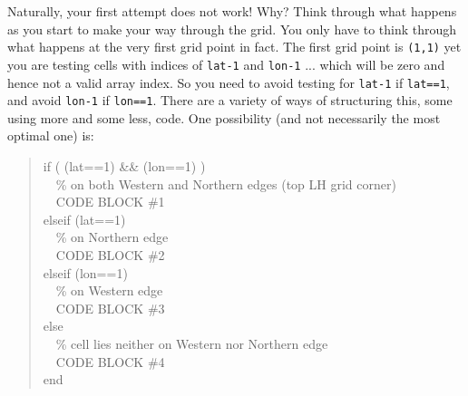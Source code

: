 \documentclass{tufte-book} %
\newenvironment{docspec}{\begin{quotation}\ttfamily\parskip0pt\parindent0pt\ignorespaces}{\end{quotation}}
\begin{document}
Naturally, your first attempt does not work! Why? Think through what happens as you start to make your way through the grid. You only have to think through what happens at the very first grid point in fact. The first grid point is \texttt{(1,1)} yet you are testing cells with indices of \texttt{lat-1} and \texttt{lon-1} ... which will be zero and hence not a valid array index. So you need to avoid testing for \texttt{lat-1} if \texttt{lat==1}, and avoid \texttt{lon-1} if \texttt{lon==1}. There are a variety of ways of structuring this, some using more and some less, code. One possibility (and not necessarily the most optimal one) is:

\begin{docspec}
if ( (lat==1) \&\& (lon==1) )
\\ \ \ \% on both Western and Northern edges (top LH grid corner)
\\ \ \ CODE BLOCK \#1
\\elseif (lat==1)
\\ \ \ \% on Northern edge
\\ \ \ CODE BLOCK \#2
\\elseif (lon==1)
\\ \ \ \% on Western edge
\\ \ \ CODE BLOCK \#3
\\else
\\ \ \ \% cell lies neither on Western nor Northern edge
\\ \ \ CODE BLOCK \#4
\\end
\end{docspec}
\end{document}
